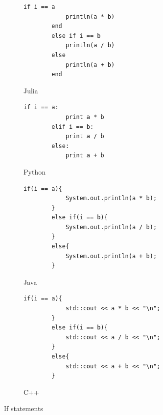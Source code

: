 \documentclass[a4paper, 11pt, titlepage]{article}
\begin{document}
\begin{figure}[H]
	\centering
	\begin{subfigure}[H]{0.7\textwidth}
		\centering
		\begin{lstlisting}[belowskip=0.5mm]
		if i == a
			println(a * b)
		end
		else if i == b
			println(a / b)
		else
			println(a + b)
		end
		\end{lstlisting}
		\caption{Julia}
	\end{subfigure}
	\begin{subfigure}[H]{0.7\textwidth}
		\centering
		\begin{lstlisting}[belowskip=0.5mm]
		if i == a:
			print a * b
		elif i == b:
			print a / b
		else:
			print a + b
		\end{lstlisting}
		\caption{Python}
	\end{subfigure}	
	\begin{subfigure}[H]{0.7\textwidth}
		\centering
		\begin{lstlisting}[belowskip=0.5mm]
		if(i == a){
			System.out.println(a * b);
		}
		else if(i == b){
			System.out.println(a / b);
		}
		else{
			System.out.println(a + b);
		}
		\end{lstlisting}
		\caption{Java}
	\end{subfigure}
	\begin{subfigure}[H]{0.7\textwidth}
		\centering
		\begin{lstlisting}[belowskip=0.5mm]
		if(i == a){
			std::cout << a * b << "\n";
		}
		else if(i == b){
			std::cout << a / b << "\n";
		}
		else{
			std::cout << a + b << "\n";
		}
		\end{lstlisting}
		\caption{C++}
	\end{subfigure}
	\caption{If statements}
	\label{ifelse}
\end{figure}
\end{document}
